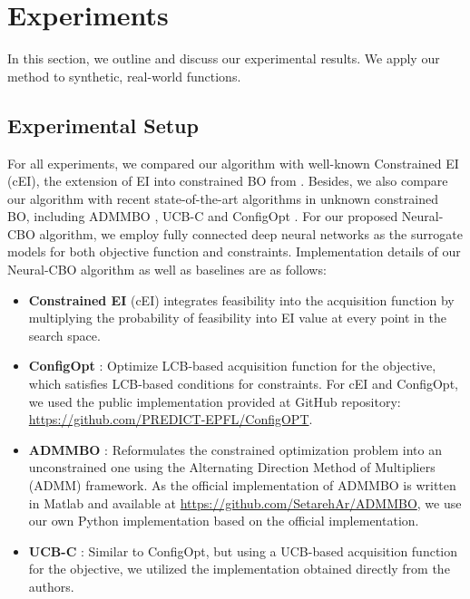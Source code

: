 \section{Experiments}
\label{section:neural-cbo_exp}
In this section, we outline and discuss our experimental results. We apply our method to synthetic, real-world functions. 
\subsection{Experimental Setup}
\label{section:neural-cbo_baselines}
For all experiments, we compared our algorithm with well-known Constrained EI (cEI), the extension of EI into constrained BO from \citet{gardner2014bayesian}. Besides, we also compare our algorithm with recent state-of-the-art algorithms in unknown constrained BO, including ADMMBO \citep{ariafar2019admmbo}, UCB-C \citep{nguyen2023optimistic} and ConfigOpt \citep{xu2023constrained}. For our proposed Neural-CBO algorithm, we employ fully connected deep neural networks as the surrogate models for both objective function and constraints. Implementation details of our Neural-CBO algorithm as well as baselines are as follows:
\begin{itemize}
    \item  \textbf{Constrained EI} (cEI) \citep{gardner2014bayesian} integrates feasibility into the acquisition function by multiplying the probability of feasibility into EI value at every point in the search space.
    \item \textbf{ConfigOpt} \citep{xu2023constrained}: Optimize LCB-based acquisition function for the objective, which satisfies LCB-based conditions for constraints. For cEI and ConfigOpt, we used the public implementation provided at GitHub repository: \url{https://github.com/PREDICT-EPFL/ConfigOPT}.
    \item \textbf{ADMMBO} \citep{ariafar2019admmbo}: Reformulates the constrained optimization problem into an unconstrained one using the Alternating Direction Method
    of Multipliers (ADMM) framework. As the official implementation of ADMMBO is written in Matlab and available at \url{https://github.com/SetarehAr/ADMMBO}, we use our own Python implementation based on the official implementation.  
    \item \textbf{UCB-C} \citep{nguyen2023optimistic}: 
    Similar to ConfigOpt, but using a UCB-based acquisition function for the objective, we utilized the implementation obtained directly from the authors.
\end{itemize}
